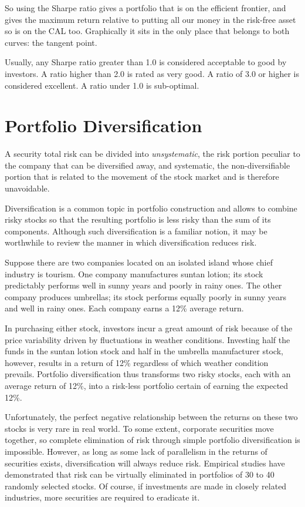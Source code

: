 So using the Sharpe ratio gives a portfolio that is on the efficient frontier, and gives the maximum return relative to putting all our money in the risk-free asset so is on the CAL too. Graphically it sits in the only place that belongs to both curves: the tangent point.

Usually, any Sharpe ratio greater than 1.0 is considered acceptable to good by investors. A ratio higher than 2.0 is rated as very good. A ratio of 3.0 or higher is considered excellent. A ratio under 1.0 is sub-optimal.

\section{Portfolio Diversification}

A security total risk can be divided into \emph{unsystematic}, the risk portion peculiar to the company that can be diversified away, and systematic, the non-diversifiable portion that is related to the movement of the stock market and is therefore unavoidable. 

Diversification is a common topic in portfolio construction and allows to combine risky stocks so that the resulting portfolio is less risky than the sum of its components. Although such diversification is a familiar notion, it may be worthwhile to review the manner in which diversification reduces risk.

Suppose there are two companies located on an isolated island whose chief industry is tourism. One company manufactures suntan lotion; its stock predictably performs well in sunny years and poorly in rainy ones. The other company produces umbrellas; its stock performs equally poorly in sunny years and well in rainy ones. Each company earns a 12\% average return.

In purchasing either stock, investors incur a great amount of risk because of the price variability driven by fluctuations in weather conditions. Investing half the funds in the suntan lotion stock and half in the umbrella manufacturer stock, however, results in a return of 12\% regardless of which weather condition prevails. Portfolio diversification thus transforms two risky stocks, each with an average return of 12\%, into a risk-less portfolio certain of earning the expected 12\%.

Unfortunately, the perfect negative relationship between the returns on these two stocks is very rare in real world. To some extent, corporate securities move together, so complete elimination of risk through simple portfolio diversification is impossible. However, as long as some lack of parallelism in the returns of securities exists, diversification will always reduce risk.
Empirical studies have demonstrated that risk can be virtually eliminated in portfolios of 30 to 40 randomly selected stocks. Of course, if investments are made in closely related industries, more securities are required to eradicate it.

